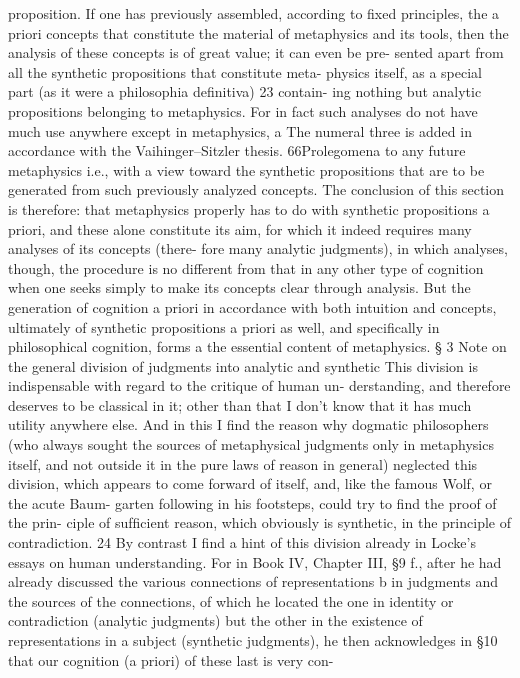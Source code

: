 proposition.
If one has previously assembled, according to ﬁxed principles, the a
priori concepts that constitute the material of metaphysics and its tools,
then the analysis of these concepts is of great value; it can even be pre-
sented apart from all the synthetic propositions that constitute meta-
physics itself, as a special part (as it were a philosophia deﬁnitiva) 23 contain-
ing nothing but analytic propositions belonging to metaphysics. For in
fact such analyses do not have much use anywhere except in metaphysics,
a
The numeral three is added in accordance with the Vaihinger–Sitzler thesis.
66Prolegomena to any future metaphysics
i.e., with a view toward the synthetic propositions that are to be generated
from such previously analyzed concepts.
The conclusion of this section is therefore: that metaphysics properly
has to do with synthetic propositions a priori, and these alone constitute
its aim, for which it indeed requires many analyses of its concepts (there-
fore many analytic judgments), in which analyses, though, the procedure
is no different from that in any other type of cognition when one seeks
simply to make its concepts clear through analysis. But the generation
of cognition a priori in accordance with both intuition and concepts,
ultimately of synthetic propositions a priori as well, and speciﬁcally in
philosophical cognition, forms a the essential content of metaphysics.
§ 3
Note on the general division of judgments
into analytic and synthetic
This division is indispensable with regard to the critique of human un-
derstanding, and therefore deserves to be classical in it; other than that I
don’t know that it has much utility anywhere else. And in this I ﬁnd the
reason why dogmatic philosophers (who always sought the sources of
metaphysical judgments only in metaphysics itself, and not outside it in
the pure laws of reason in general) neglected this division, which appears
to come forward of itself, and, like the famous Wolf, or the acute Baum-
garten following in his footsteps, could try to ﬁnd the proof of the prin-
ciple of sufﬁcient reason, which obviously is synthetic, in the principle of
contradiction. 24 By contrast I ﬁnd a hint of this division already in Locke’s
essays on human understanding. For in Book IV, Chapter III, §9 f., after
he had already discussed the various connections of representations b in
judgments and the sources of the connections, of which he located the
one in identity or contradiction (analytic judgments) but the other in the
existence of representations in a subject (synthetic judgments), he then
acknowledges in §10 that our cognition (a priori) of these last is very con-
